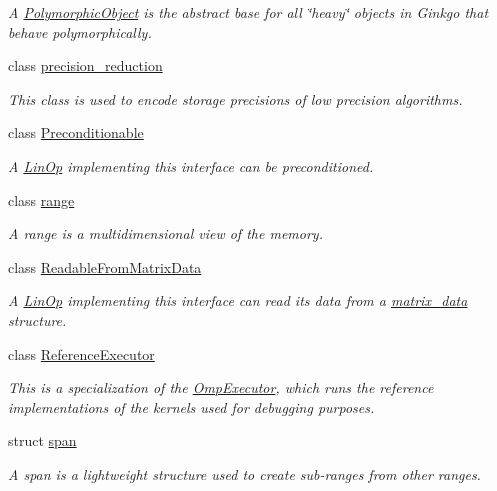 \begin{DoxyCompactItemize}
\begin{DoxyCompactList}\small\item\em A \hyperlink{classgko_1_1PolymorphicObject}{Polymorphic\+Object} is the abstract base for all \char`\"{}heavy\char`\"{} objects in Ginkgo that behave polymorphically. \end{DoxyCompactList}\item 
class \hyperlink{classgko_1_1precision__reduction}{precision\+\_\+reduction}
\begin{DoxyCompactList}\small\item\em This class is used to encode storage precisions of low precision algorithms. \end{DoxyCompactList}\item 
class \hyperlink{classgko_1_1Preconditionable}{Preconditionable}
\begin{DoxyCompactList}\small\item\em A \hyperlink{classgko_1_1LinOp}{Lin\+Op} implementing this interface can be preconditioned. \end{DoxyCompactList}\item 
class \hyperlink{classgko_1_1range}{range}
\begin{DoxyCompactList}\small\item\em A range is a multidimensional view of the memory. \end{DoxyCompactList}\item 
class \hyperlink{classgko_1_1ReadableFromMatrixData}{Readable\+From\+Matrix\+Data}
\begin{DoxyCompactList}\small\item\em A \hyperlink{classgko_1_1LinOp}{Lin\+Op} implementing this interface can read its data from a \hyperlink{structgko_1_1matrix__data}{matrix\+\_\+data} structure. \end{DoxyCompactList}\item 
class \hyperlink{classgko_1_1ReferenceExecutor}{Reference\+Executor}
\begin{DoxyCompactList}\small\item\em This is a specialization of the \hyperlink{classgko_1_1OmpExecutor}{Omp\+Executor}, which runs the reference implementations of the kernels used for debugging purposes. \end{DoxyCompactList}\item 
struct \hyperlink{structgko_1_1span}{span}
\begin{DoxyCompactList}\small\item\em A span is a lightweight structure used to create sub-\/ranges from other ranges. \end{DoxyCompactList}\item 

\end{DoxyCompactItemize}
